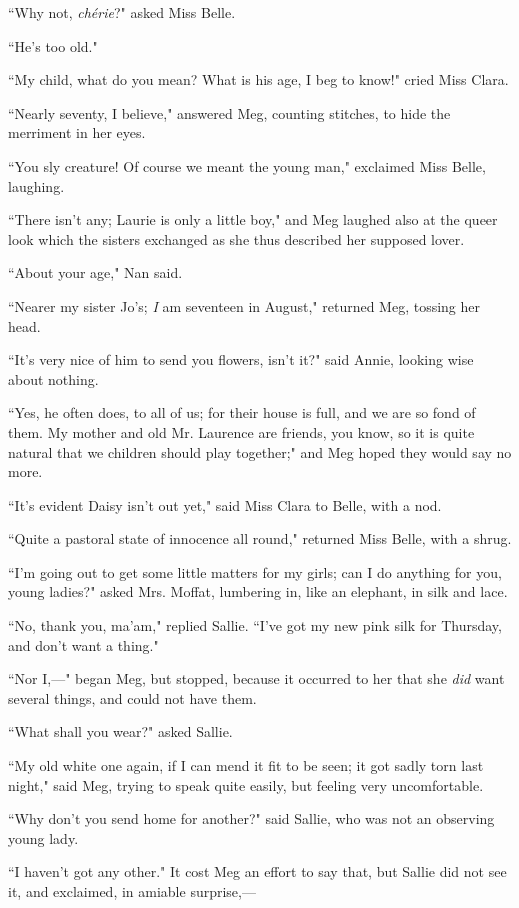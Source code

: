 ``Why not, \emph{chérie}?" asked Miss Belle.

``He's too old."

``My child, what do you mean? What is his age, I beg to know!" cried Miss
Clara.

``Nearly seventy, I believe," answered Meg, counting stitches, to hide
the merriment in her eyes.

``You sly creature! Of course we meant the young man," exclaimed Miss
Belle, laughing.

``There isn't any; Laurie is only a little boy," and Meg
laughed also at the queer look which the sisters exchanged as she thus
described her supposed lover.

``About your age," Nan said.

``Nearer my sister Jo's; \emph{I} am seventeen in
August," returned Meg, tossing her head.

``It's very nice of him to send you flowers,
isn't it?" said Annie, looking wise about nothing.

``Yes, he often does, to all of us; for their house is full, and we are
so fond of them. My mother and old Mr. Laurence are friends, you know,
so it is quite natural that we children should play together;" and Meg
hoped they would say no more.

``It's evident Daisy isn't out yet," said
Miss Clara to Belle, with a nod.

``Quite a pastoral state of innocence all round," returned Miss Belle,
with a shrug.

``I'm going out to get some little matters for my girls;
can I do anything for you, young ladies?" asked Mrs. Moffat, lumbering
in, like an elephant, in silk and lace.

``No, thank you, ma'am," replied Sallie.
``I've got my new pink silk for Thursday, and
don't want a thing."

``Nor I,---" began Meg, but stopped, because it occurred to her that she
\emph{did} want several things, and could not have them.

``What shall you wear?" asked Sallie.

``My old white one again, if I can mend it fit to be seen; it got sadly
torn last night," said Meg, trying to speak quite easily, but feeling
very uncomfortable.

``Why don't you send home for another?" said Sallie, who
was not an observing young lady.

``I haven't got any other." It cost Meg an effort to say
that, but Sallie did not see it, and exclaimed, in amiable surprise,---

